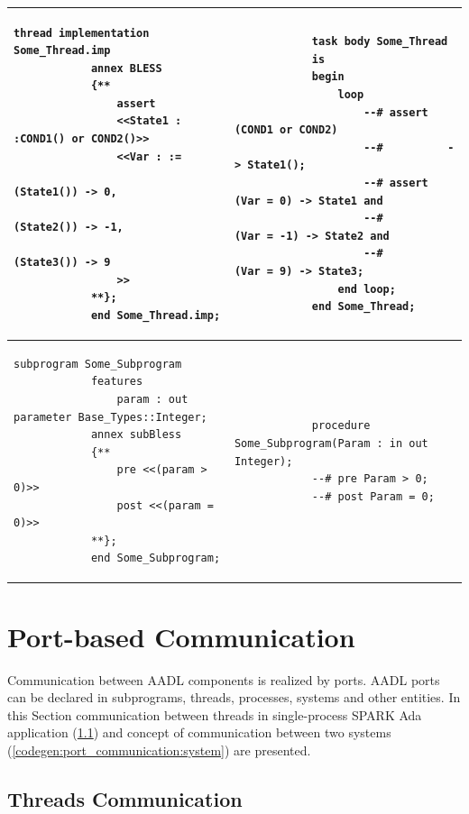 \begin{center}
\begin{longtable}{| p{3in} | p{3in} |}
		\\ \hline

		\begin{lstlisting}[language=bless]
			thread implementation Some_Thread.imp
			annex BLESS 
			{**
				assert
				<<State1 : :COND1() or COND2()>>
				<<Var : :=
  								(State1()) -> 0,
  								(State2()) -> -1,
  								(State3()) -> 9
				>>
			**};
			end Some_Thread.imp;
		\end{lstlisting} 
		& 
		\begin{lstlisting}
			task body Some_Thread
			is
			begin
				loop
					--# assert (COND1 or COND2)
					--#          -> State1();
					--# assert (Var = 0) -> State1 and
					--#        (Var = -1) -> State2 and
					--#        (Var = 9) -> State3;
				end loop;
			end Some_Thread;
		\end{lstlisting} 

		\\ \hline

		\begin{lstlisting}[language=bless]
			subprogram Some_Subprogram
			features 
				param : out parameter Base_Types::Integer;
			annex subBless
			{**
				pre <<(param > 0)>>
				post <<(param = 0)>>
			**};
			end Some_Subprogram;
		\end{lstlisting} 
		& 
		\begin{lstlisting}
			procedure Some_Subprogram(Param : in out Integer);
		    --# pre Param > 0;
		    --# post Param = 0;
		\end{lstlisting} 
		
	\end{longtable}
\end{center}
\doublespacing


\section{Port-based Communication}
\label{codegen:port_communication}

Communication between AADL components is realized by ports. AADL ports can be declared in subprograms, threads, processes, systems and other entities. In this Section communication between threads in single-process SPARK Ada application (\ref{codegen:port_communication:thread}) and concept of communication between two systems (\ref{codegen:port_communication:system}) are presented. 


\subsection{Threads Communication}
\label{codegen:port_communication:thread}

